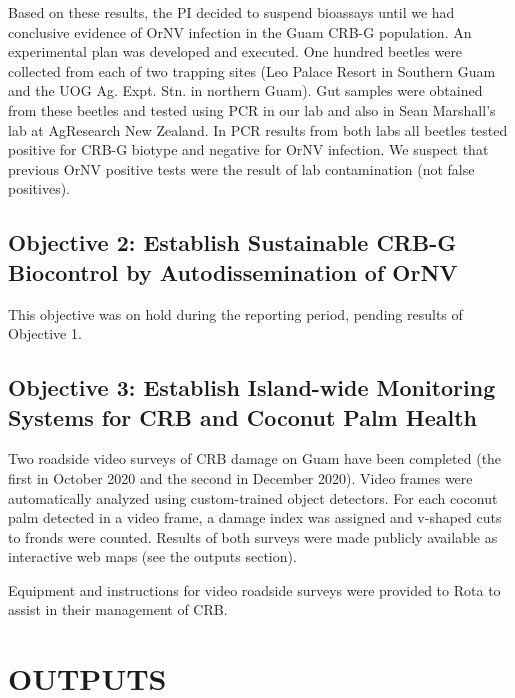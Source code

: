 \documentclass[12pt,letterpaper,english,bibliography=totocnumbered,abstract=on]{scrartcl}
\begin{document}
Based on these results, the PI decided to suspend bioassays until we had conclusive evidence of OrNV infection in the Guam CRB-G population.  An experimental plan was developed and executed. One hundred beetles were collected from each of two trapping sites (Leo Palace Resort in Southern Guam and the UOG Ag. Expt. Stn. in northern Guam). Gut samples were obtained from these beetles and tested using PCR in our lab and also in Sean Marshall's lab at AgResearch New Zealand. In PCR results from both labs all beetles tested positive for CRB-G biotype and negative for OrNV infection. We suspect that previous OrNV positive tests were the result of lab contamination (not false positives). 

\subsection{Objective 2: Establish Sustainable CRB-G Biocontrol by Autodissemination of OrNV}

This objective was on hold during the reporting period, pending results of Objective 1.

\subsection{Objective 3: Establish Island-wide Monitoring Systems for CRB and Coconut Palm Health}

Two roadside video surveys of CRB damage on Guam have been completed (the first in October 2020 and the second in December 2020).  Video frames were automatically analyzed using custom-trained object detectors. For each coconut palm detected in a video frame, a damage index was assigned and v-shaped cuts to fronds were counted. Results of both surveys were made  publicly available as interactive web maps (see the outputs section).

Equipment and instructions for video roadside surveys were provided to Rota to assist in their management of CRB.

\clearpage
\section{OUTPUTS} 

%
%
%
%
%
%
\end{document}
